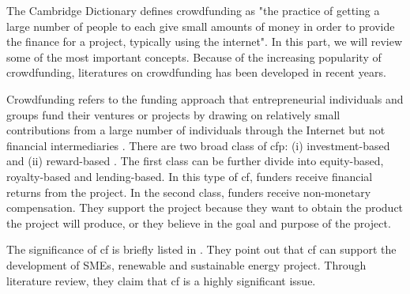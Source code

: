 The Cambridge Dictionary \parencite{2023} defines crowdfunding as
"the practice of getting a large number of people to each give small amounts of money in order to provide the finance for a \gls{project}, typically using the internet".
In this part, we will review some of the most important concepts.
Because of the increasing popularity of crowdfunding, literatures on crowdfunding has been developed in recent years.


Crowdfunding refers to the funding approach that entrepreneurial individuals and groups
fund their ventures or projects by drawing on relatively small contributions
from a large number of individuals through the Internet but not financial intermediaries \parencite{mollick2014}.
There are two broad class of \acrshort{cfp}: (i) investment-based and (ii) reward-based \parencite{belleflamme2015}.
The first class can be further divide into equity-based, royalty-based and lending-based.
In this type of \acrshort{cf}, funders receive financial returns from the project.
In the second class, funders receive non-monetary compensation.
They support the project because they want to obtain the product the project will produce,
or they believe in the goal and purpose of the project.

The significance of \acrshort{cf} is briefly listed in \parencite{xie2019}.
They point out that \acrshort{cf} can support the development of SMEs,
renewable and sustainable energy project.
Through literature review, they claim that \acrshort{cf} is a highly significant issue.

